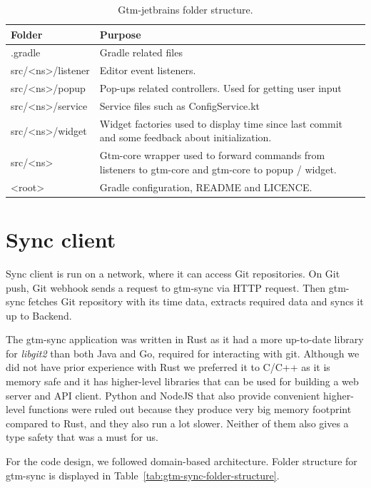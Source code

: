 \begin{table}[h]
    \centering
    \begin{tabular}{ | p{3cm} | p{10cm} |}
        \hline
        \textbf{Folder} & \textbf{Purpose}\\
        \hline
        .gradle & Gradle related files\\
        \hline
        src/<ns>/listener & Editor event listeners.\\
        \hline
        src/<ns>/popup & Pop-ups related controllers.
        Used for getting user input\\
        \hline
        src/<ns>/service & Service files such as ConfigService.kt\\
        \hline
        src/<ns>/widget & Widget factories used to display time since last commit and some feedback about initialization.\\
        \hline
        src/<ns> & Gtm-core wrapper used to forward commands from listeners to gtm-core and gtm-core to popup / widget.\\
        \hline
        <root> & Gradle configuration, README and LICENCE.\\
        \hline
    \end{tabular}
    \caption{Gtm-jetbrains folder structure.}
    \label{tab:gtm-jetbrains-folder-structure}
\end{table}

\section{Sync client}\label{sec:sync-client}
Sync client is run on a network, where it can access Git repositories.
On Git push, Git webhook sends a request to gtm-sync via HTTP request.
Then gtm-sync fetches Git repository with its time data, extracts required data and syncs it up to Backend.

The gtm-sync application was written in Rust as it had a more up-to-date library for \textit{libgit2} than both Java and Go, required for interacting with git.
Although we did not have prior experience with Rust we preferred it to C/C++ as it is memory safe and it has higher-level libraries that can be
used for building a web server and API client.
Python and NodeJS that also provide convenient higher-level functions were ruled out because they produce very
big memory footprint compared to Rust, and they also run a lot slower.
Neither of them also gives a type safety that was a must for us.

For the code design, we followed domain-based architecture.
Folder structure for gtm-sync is displayed in Table~\ref{tab:gtm-sync-folder-structure}.

